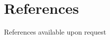 \documentclass[11pt,a4paper,sans]{moderncv}        %
\begin{document}
%

\section{References}
References available upon request

%

\end{document}
